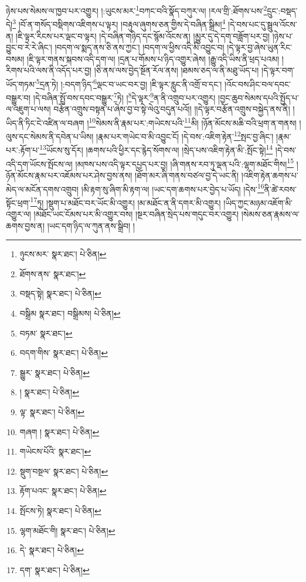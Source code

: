 ཉེས་པས་སེམས་ལ་ཁྱབ་པར་འགྱུར། །:ཡུངས་མར་\footnote{ཉུངས་མར་  སྣར་ཐང་།  པེ་ཅིན། }བཀང་བའི་སྣོད་བཀུར་ལ། །རལ་གྲི་:ཐོགས་པས་\footnote{ཐོགས་ནས་  སྣར་ཐང་། }དྲུང་:བསྡད་དེ།\footnote{བསྡད་སྟེ།  སྣར་ཐང་།  པེ་ཅིན། } །བོ་ན་གསོད་བསྡིགས་འཇིགས་པ་ལྟར། །བརྟུལ་ཞུགས་ཅན་གྱིས་དེ་བཞིན་སྒྲིམ།\footnote{བསྒྲིམ  སྣར་ཐང་། བསྒྲིམས།  པེ་ཅིན། } །དེ་བས་པང་དུ་སྦྲུལ་འོངས་ན། །ཇི་ལྟར་རིངས་པར་ལྡང་བ་ལྟར། །དེ་བཞིན་གཉིད་དང་སྙོམ་འོངས་ན། །མྱུར་དུ་དེ་དག་བཟློག་པར་བྱ། །ཉེས་པ་བྱུང་བ་རེ་རེ་ཞིང་། །བདག་ལ་སྨད་ནས་ཅི་ནས་ཀྱང་། །བདག་ལ་ཕྱིས་འདི་མི་འབྱུང་བ། །དེ་ལྟར་བྱ་ཞེས་ཡུན་རིང་བསམ། །ཇི་ལྟར་གནས་སྐབས་འདི་དག་ལ། །དྲན་པ་གོམས་པ་ཉིད་འགྱུར་ཞེས། །རྒྱུ་འདི་ཡིས་ནི་ཕྲད་པའམ། །རིགས་པའི་ལས་ནི་འདོད་པར་བྱ། །ཅི་ནས་ལས་བྱེད་སྔོན་རོལ་ནས། །ཐམས་ཅད་ལ་ནི་མཐུ་ཡོད་པ། །དེ་ལྟར་བག་ཡོད་གཏམ་\footnote{བཏམ་  སྣར་ཐང་། }དྲན་ཏེ། །:བདག་ཉིད་\footnote{བདག་གིས་  སྣར་ཐང་།  པེ་ཅིན། }ལྡང་བ་ཡང་བར་བྱ། །ཇི་ལྟར་རླུང་ནི་འགྲོ་བ་དང་། །འོང་བས་ཤིང་བལ་དབང་བསྒྱུར་བ། །དེ་བཞིན་སྤྲོ་བས་དབང་བསྒྱུར་\footnote{སྒྱུར་  སྣར་ཐང་།  པེ་ཅིན། }ཏེ། །\footnote{།   སྣར་ཐང་།  པེ་ཅིན། }དེ་ལྟར་\footnote{ལྟ་  སྣར་ཐང་།  པེ་ཅིན། }ན་ནི་འགྲུབ་པར་འགྱུར། །བྱང་ཆུབ་སེམས་དཔའི་སྤྱོད་པ་ལ་འཇུག་པ་ལས། བརྩོན་འགྲུས་བསྟན་པ་ཞེས་བྱ་བ་སྟེ་ལེའུ་བདུན་པའོ།། །།དེ་ལྟར་བརྩོན་འགྲུས་བསྐྱེད་ནས་ནི། །ཡིད་ནི་ཏིང་ངེ་འཛིན་ལ་བཞག །\footnote{གཞག །  སྣར་ཐང་།  པེ་ཅིན། }སེམས་ནི་རྣམ་པར་:གཡེངས་པའི་\footnote{གཡེངས་པོའི་  སྣར་ཐང་། }མི། །ཉོན་མོངས་མཆི་བའི་ཕྲག་ན་གནས། །ལུས་དང་སེམས་ནི་དབེན་པ་ཡིས། །རྣམ་པར་གཡེང་བ་མི་འབྱུང་ངོ། །དེ་བས་:འཇིག་རྟེན་\footnote{སྡུག་བསྔལ་  སྣར་ཐང་།  པེ་ཅིན། }སྤང་བྱ་ཞིང་། །རྣམ་པར་:རྟོག་པ་\footnote{རྟོག་པའང་  སྣར་ཐང་།  པེ་ཅིན། }ཡོངས་སུ་དོར། །ཆགས་པའི་ཕྱིར་དང་རྙེད་སོགས་ལ། །སྲེད་པས་འཇིག་རྟེན་མི་:སྤོང་སྟེ།\footnote{སྤོངས་ཏེ།  སྣར་ཐང་།  པེ་ཅིན། } །དེ་བས་འདི་དག་ཡོངས་སྤོངས་ལ། །མཁས་པས་འདི་ལྟར་དཔྱད་པར་བྱ། །ཞི་གནས་རབ་ཏུ་ལྡན་པའི་:ལྷག་མཐོང་གིས།\footnote{ལྷག་མཐོང་གི།  སྣར་ཐང་།  པེ་ཅིན། } །ཉོན་མོངས་རྣམ་པར་འཇོམས་པར་ཤེས་བྱས་ནས། །ཐོག་མར་ཞི་གནས་བཙལ་བྱ་དེ་ཡང་ནི། །འཇིག་རྟེན་ཆགས་པ་མེད་ལ་མངོན་དགས་འགྲུབ། །མི་རྟག་སུ་ཞིག་མི་རྟག་ལ། །ཡང་དག་ཆགས་པར་བྱེད་པ་ཡོད། །དེས་\footnote{དེ་  སྣར་ཐང་།  པེ་ཅིན། }ནི་ཚེ་རབས་སྟོང་ཕྲག་\footnote{དག་  སྣར་ཐང་།  པེ་ཅིན། }ཏུ། །སྡུག་པ་མཐོང་བར་ཡོང་མི་འགྱུར། །མ་མཐོང་ན་ནི་དགར་མི་འགྱུར། །ཡིད་ཀྱང་མཉམ་འཇོག་མི་འགྱུར་ལ། །མཐོང་ཡང་ངོམས་པར་མི་འགྱུར་བས། །སྔར་བཞིན་སྲེད་པས་གདུང་བར་འགྱུར། །སེམས་ཅན་རྣམས་ལ་ཆགས་བྱས་ན། །ཡང་དག་ཉིད་ལ་ཀུན་ནས་སྒྲིབ། །
